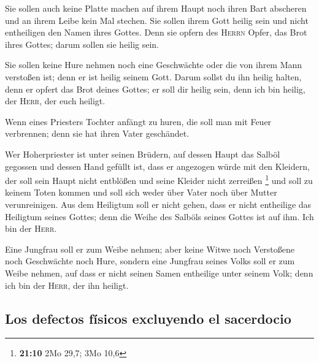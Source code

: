  Sie sollen auch keine Platte machen auf ihrem Haupt noch
ihren Bart abscheren und an ihrem Leibe kein Mal stechen. 
Sie sollen ihrem Gott heilig sein und nicht entheiligen den Namen ihres
Gottes. Denn sie opfern des \textsc{Herrn} Opfer, das Brot ihres Gottes;
darum sollen sie heilig sein.

 Sie sollen keine Hure nehmen noch eine Geschwächte oder
die von ihrem Mann verstoßen ist; denn er ist heilig seinem Gott.
 Darum sollst du ihn heilig halten, denn er opfert das
Brot deines Gottes; er soll dir heilig sein, denn ich bin heilig, der
\textsc{Herr}, der euch heiligt.

 Wenn eines Priesters Tochter anfängt zu huren, die soll
man mit Feuer verbrennen; denn sie hat ihren Vater geschändet.

 Wer Hoherpriester ist unter seinen Brüdern, auf dessen
Haupt das Salböl gegossen und dessen Hand gefüllt ist, dass er angezogen
würde mit den Kleidern, der soll sein Haupt nicht entblößen und seine
Kleider nicht zerreißen \footnote{\textbf{21:10} 2Mo 29,7; 3Mo 10,6}
 und soll zu keinem Toten kommen und soll sich weder über
Vater noch über Mutter verunreinigen.  Aus dem Heiligtum
soll er nicht gehen, dass er nicht entheilige das Heiligtum seines
Gottes; denn die Weihe des Salböls seines Gottes ist auf ihm. Ich bin
der \textsc{Herr}.

 Eine Jungfrau soll er zum Weibe nehmen; 
aber keine Witwe noch Verstoßene noch Geschwächte noch Hure, sondern
eine Jungfrau seines Volks soll er zum Weibe nehmen,  auf
dass er nicht seinen Samen entheilige unter seinem Volk; denn ich bin
der \textsc{Herr}, der ihn heiligt.

\hypertarget{los-defectos-fuxedsicos-excluyendo-el-sacerdocio}{%
\subsection{Los defectos físicos excluyendo el
sacerdocio}\label{los-defectos-fuxedsicos-excluyendo-el-sacerdocio}}

